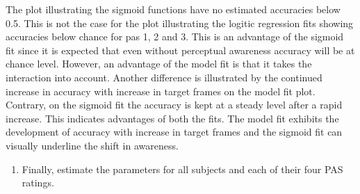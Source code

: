 \documentclass[
]{article}
\providecommand{\tightlist}{%
  \setlength{\itemsep}{0pt}\setlength{\parskip}{0pt}}
\begin{document}
The plot illustrating the sigmoid functions have no estimated accuracies
below 0.5. This is not the case for the plot illustrating the logitic
regression fits showing accuracies below chance for pas 1, 2 and 3. This
is an advantage of the sigmoid fit since it is expected that even
without perceptual awareness accuracy will be at chance level. However,
an advantage of the model fit is that it takes the interaction into
account. Another difference is illustrated by the continued increase in
accuracy with increase in target frames on the model fit plot. Contrary,
on the sigmoid fit the accuracy is kept at a steady level after a rapid
increase. This indicates advantages of both the fits. The model fit
exhibits the development of accuracy with increase in target frames and
the sigmoid fit can visually underline the shift in awareness.

\begin{enumerate}
\def\labelenumi{\arabic{enumi})}
\setcounter{enumi}{1}
\tightlist
\item
  Finally, estimate the parameters for all subjects and each of their
  four PAS ratings.
\end{enumerate}
\end{document}
